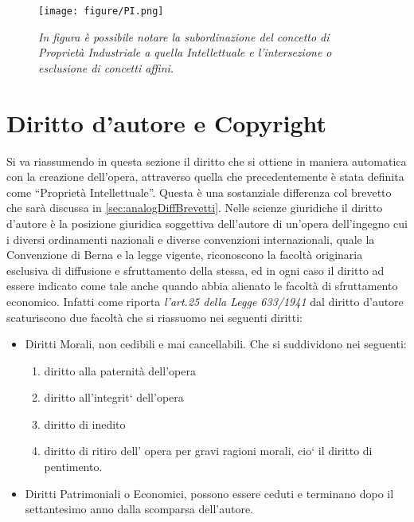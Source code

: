 \begin{figure}[bh] \label{fig:PI}
	\begin{center}
		\texttt{[image: figure/PI.png]}
	\end{center}
	\caption{\textit{In figura è possibile notare la subordinazione del concetto di Proprietà Industriale a quella Intellettuale e l'intersezione o esclusione di concetti affini.}}
\end{figure}



\section{Diritto d'autore e Copyright}
Si va riassumendo in questa sezione il diritto che si ottiene in maniera automatica con la creazione dell'opera, attraverso quella che precedentemente è stata definita come ``Proprietà Intellettuale''. Questa è una sostanziale differenza col brevetto che sarà discussa in \ref{sec:analogDiffBrevetti}.
Nelle scienze giuridiche il diritto d'autore è la posizione giuridica soggettiva dell'autore di un'opera dell'ingegno cui i diversi ordinamenti nazionali e diverse convenzioni internazionali, quale la Convenzione di Berna e la legge vigente, riconoscono la facoltà originaria esclusiva di diffusione e sfruttamento della stessa, ed in ogni caso il diritto ad essere indicato come tale anche quando abbia alienato le facoltà di sfruttamento economico.
Infatti come riporta \textit{l'art.25 della Legge 633/1941} dal diritto d'autore scaturiscono due facoltà che si riassuomo nei seguenti diritti:
\begin{itemize}
 \item Diritti Morali, non cedibili e mai cancellabili. Che si suddividono nei seguenti:

\begin{enumerate}
\item diritto alla paternità dell’opera
\item diritto all’integrit` dell’opera
\item diritto di inedito
\item diritto di ritiro dell’ opera per gravi ragioni morali, cio` il diritto di pentimento.
\end{enumerate}

 \item Diritti Patrimoniali o Economici, possono essere ceduti e terminano dopo il settantesimo anno dalla scomparsa dell'autore.
\end{itemize}


